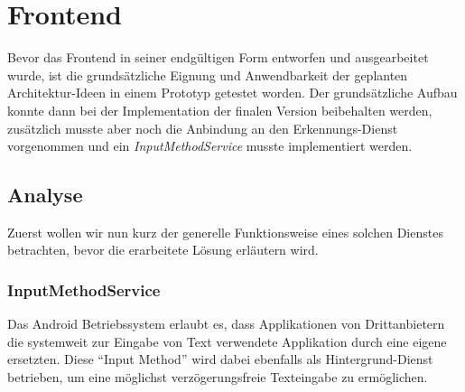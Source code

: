 \chapter{Frontend}

Bevor das Frontend in seiner endgültigen Form entworfen und ausgearbeitet wurde, ist die grundsätzliche Eignung und Anwendbarkeit der geplanten Architektur-Ideen in einem Prototyp getestet worden. Der grundsätzliche Aufbau konnte dann bei der Implementation der finalen Version beibehalten werden, zusätzlich musste aber noch die Anbindung an den Erkennungs-Dienst vorgenommen und ein \emph{InputMethodService} musste implementiert werden.

\section{Analyse}

Zuerst wollen wir nun kurz der generelle Funktionsweise eines solchen Dienstes betrachten, bevor die erarbeitete Lösung erläutern wird.

\subsection{InputMethodService}

Das Android Betriebssystem erlaubt es, dass Applikationen von Drittanbietern die systemweit zur Eingabe von Text verwendete Applikation durch eine eigene ersetzten. Diese ``Input Method'' wird dabei ebenfalls als Hintergrund-Dienst betrieben, um eine möglichst verzögerungsfreie Texteingabe zu ermöglichen.
